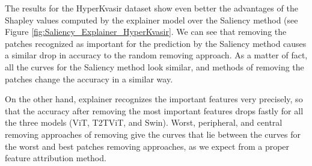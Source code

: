 \documentclass[magisterska,en]{pracamgr}
\begin{document}
The results for the HyperKvasir dataset show even better the advantages of the Shapley values computed by the explainer model over the Saliency method (see Figure \ref{fig:Saliency_Explainer_HyperKvasir}. We can see that removing the patches recognized as important for the prediction by the Saliency method causes a similar drop in accuracy to the random removing approach. As a matter of fact, all the curves for the Saliency method look similar, and methods of removing the patches change the accuracy in a similar way.

On the other hand, explainer recognizes the important features very precisely, so that the accuracy after removing the most important features drops fastly for all the three models (ViT, T2T\textunderscore ViT, and Swin). Worst, peripheral, and central removing approaches of removing give the curves that lie between the curves for the worst and best patches removing approaches, as we expect from a proper feature attribution method.
\end{document}
